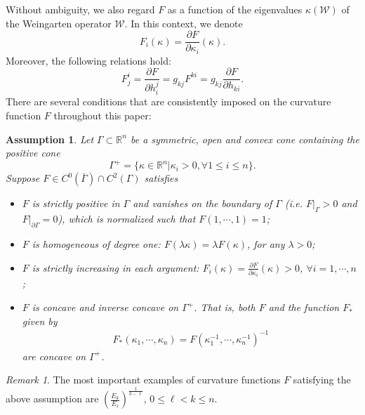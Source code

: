 \documentclass[11pt,reqno]{amsart}
\newtheorem{assump}[thm]{Assumption}
\theoremstyle{definition}
\newtheorem{defn}[thm]{Definition}
\theoremstyle{remark}
\newtheorem{rem}{Remark}
\numberwithin{equation}{section}
\renewcommand{\(}{\left(}
\renewcommand{\)}{\right)}
\renewcommand{\-}{\overline}
\begin{document}
Without ambiguity, we also  regard $F$ as a function of the eigenvalues $\kappa(\mathcal{W})$ of the Weingarten operator $\mathcal{W}$. In this context, we denote 
$$F_i(\kappa)=\frac{\partial F}{\partial\kappa_i}(\kappa).$$
Moreover, the following relations hold:
\begin{equation*}
	F_j^i=\frac{\partial F}{\partial h_i^j}=g_{kj}F^{ki}=g_{kj}\frac{\partial F}{\partial h_{ki}}.
\end{equation*}
There are several conditions that are consistently imposed on the curvature function $F$ throughout this paper:
\begin{assump}\label{assum}
	Let $\Gamma\subset\mathbb{R}^n$ be a symmetric, open and convex cone containing the positive cone 
	\begin{equation}
		\Gamma^{+}=\{\kappa\in\mathbb{R}^n|\kappa_i>0,\forall 1\leq i\leq n\}. 
	\end{equation}
	Suppose $F\in C^0(\bar{\Gamma})\cap C^2(\Gamma)$  satisfies 
	\begin{itemize}
		\item[(i)] $F$ is strictly positive in $\Gamma$ and vanishes on the boundary of $\Gamma$ (i.e. $F|_{\Gamma}>0$ and $F|_{\partial\Gamma}=0$), which is normalized such that $F(1,\cdots,1)=1$;
		\item[(ii)] $F$ is homogeneous of degree one: $F(\lambda\kappa)=\lambda F(\kappa)$, for any $\lambda>0$;
		\item[(iii)] $F$ is  strictly increasing in each argument: $F_i(\kappa)=\frac{\partial F}{\partial\kappa_i}(\kappa)>0$, $\forall i=1,\cdots,n$;
		\item[(iv)] $F$ is concave and inverse concave on $\Gamma^+$. That is, both $F$ and the function $F_{*}$ given by
		\begin{align*}
			F_{*}(\kappa_1,\cdots,\kappa_n)=F(\kappa_1^{-1},\cdots,\kappa_n^{-1})^{-1}
		\end{align*}
		are concave on $\Gamma^+$.
	\end{itemize}
\end{assump}
\begin{rem}
	The most important examples of  curvature functions $F$ satisfying the above assumption are $\left(\frac{E_k}{E_{\ell}}\right)^{\frac{1}{k-\ell}}$, $0\leq \ell<k\leq n$.
\end{rem}
\end{document}
